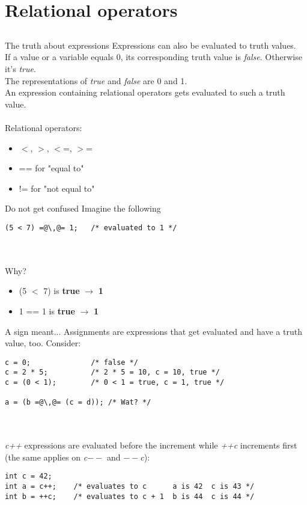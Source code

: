 \section{Relational operators}
\subsection{}
\begin{frame}{The truth about expressions}
	Expressions can also be evaluated to truth values.\\
	If a value or a variable equals 0, its corresponding truth value is \textit{false}. Otherwise it's \textit{true}.\\
	The representations of \textit{true} and \textit{false} are 0 and 1.\\
	An expression containing relational operators gets evaluated to such a truth value.\\
	\ \\Relational operators:
	\begin{itemize}
		\item $<$, $>$, $<$=, $>$=
		\item == for "equal to"
		\item != for "not equal to"
	\end{itemize}
\end{frame}
\begin{frame}[fragile]{Do not get confused}
	Imagine the following
	\begin{lstlisting}[numbers=none]
(5 < 7) =@\,@= 1;	/* evaluated to 1 */
\end{lstlisting}
\ \\\ \\Why?
\begin{itemize}
	\item<2-> (5 $<$ 7) is \textbf{true} $\rightarrow$ \textbf{1}
	\item<3-> 1 == 1 is \textbf{true} $\rightarrow$ \textbf{1}
\end{itemize}
\end{frame}
\begin{frame}[fragile]{A sign meant...}
	Assignments are expressions that get evaluated and have a truth value, too.
	Consider:
		\begin{lstlisting}[numbers=none]
c = 0;				/* false */
c = 2 * 5;			/* 2 * 5 = 10, c = 10, true */
c = (0 < 1);		/* 0 < 1 = true, c = 1, true */

a = (b =@\,@= (c = d));	/* Wat? */
\end{lstlisting}\ \\
	\ \\\textit{c++} expressions are evaluated before the increment while \textit{++c} increments first (the same applies on \textit{c$--$} and \textit{$--$c}):
	\begin{lstlisting}[numbers=none]
int c = 42;
int a = c++;	/* evaluates to c	   a is 42  c is 43 */
int b = ++c;	/* evaluates to c + 1  b is 44  c is 44 */
\end{lstlisting}
\end{frame}
